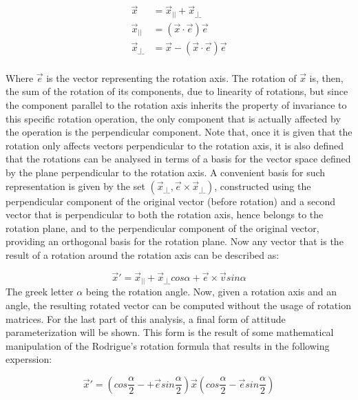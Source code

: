 \begin{align}
	\vec{x} &= \vec{x}_{||} + \vec{x}_{\_|\_} \\
	\vec{x}_{||} &= (\vec{x} \cdot \vec{e}) \vec{e} \\
	\vec{x}_{\_|\_} &= \vec{x} - (\vec{x} \cdot \vec{e}) \vec{e} \\
\end{align}

\indent 
	Where $\vec{e}$ is the vector representing the rotation axis. The rotation of $\vec{x}$ is, then, the sum of the rotation of its components, due to linearity of rotations, but since the component parallel to the rotation axis inherits the property of invariance to this specific rotation operation, the only component that is actually affected by the operation is the perpendicular component. Note that, once it is given that the rotation only affects vectors perpendicular to the rotation axis, it is also defined that the rotations can be analysed in terms of a basis for the vector space defined by the plane perpendicular to the rotation axis. A convenient basis for such representation is given by the set $\left( \vec{x}_{\_|\_},  \vec{e} \times \vec{x}_{\_|\_} \right)$, constructed using the perpendicular component of the original vector (before rotation) and a second vector that is perpendicular to both the rotation axis, hence belongs to the rotation plane, and to the perpendicular component of the original vector, providing an orthogonal basis for the rotation plane. Now any vector that is the result of a rotation around the rotation axis can be described as: 

\begin{equation}
	\vec{x}' = \vec{x}_{||} + \vec{x}_{\_|\_} cos \alpha + \vec{e} \times \vec{v}sin \alpha
\end{equation}
\indent
	The greek letter $\alpha$ being the rotation angle. Now, given a rotation axis and an angle, the resulting rotated vector can be computed without the usage of rotation matrices. For the last part of this analysis, a final form of attitude parameterization will be shown. This form is the result of some mathematical manipulation of the Rodrigue's rotation formula that results in the following experssion:

\begin{equation}
	\vec{x}' =  (cos \frac{\alpha }{2}-+\vec{e} sin\frac{\alpha }{2}) \vec{x} (cos \frac{\alpha }{2} - \vec{e} sin \frac{\alpha }{2})
\end{equation}

